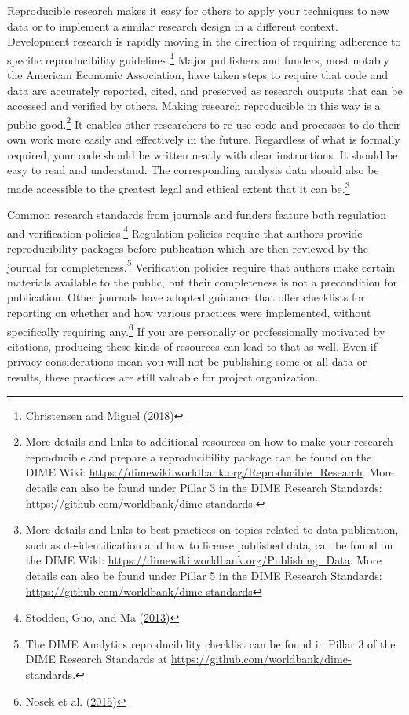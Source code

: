 \documentclass[
]{book}
\begin{document}
Reproducible research makes it easy
for others to apply your techniques to new data
or to implement a similar research design in a different context.
Development research is rapidly moving in the direction of requiring adherence
to specific reproducibility guidelines.\footnote{Christensen and Miguel (\protect\hyperlink{ref-christensen2018transparency}{2018})}
Major publishers and funders, most notably the American Economic Association,
have taken steps to require that code and data
are accurately reported, cited, and preserved as research outputs
that can be accessed and verified by others.
Making research reproducible in this way is a public good.\footnote{More details and links to additional resources on
  how to make your research reproducible and prepare a reproducibility package
  can be found on the DIME Wiki:
  \url{https://dimewiki.worldbank.org/Reproducible_Research}.
  More details can also be found under Pillar 3 in the DIME Research Standards:
  \url{https://github.com/worldbank/dime-standards}.}
It enables other researchers to re-use code and processes
to do their own work more easily and effectively in the future.
Regardless of what is formally required,
your code should be written neatly with clear instructions.
It should be easy to read and understand.
The corresponding analysis data should also be made accessible
to the greatest legal and ethical extent that it can be.\footnote{More details and links to best practices on topics related to data publication,
  such as de-identification and how to license published data,
  can be found on the DIME Wiki:
  \url{https://dimewiki.worldbank.org/Publishing_Data}.
  More details can also be found under Pillar 5 in the DIME Research Standards:
  \url{https://github.com/worldbank/dime-standards}}

Common research standards from journals and funders feature both
regulation and verification policies.\footnote{Stodden, Guo, and Ma (\protect\hyperlink{ref-stodden2013toward}{2013})}
Regulation policies require that authors
provide reproducibility packages before publication
which are then reviewed by the journal for completeness.\footnote{The DIME Analytics reproducibility checklist can be found in Pillar 3 of
  the DIME Research Standards at \url{https://github.com/worldbank/dime-standards}.}
Verification policies require that authors
make certain materials available to the public,
but their completeness is not a precondition for publication.
Other journals have adopted guidance that offer checklists
for reporting on whether and how various practices were implemented,
without specifically requiring any.\footnote{Nosek et al. (\protect\hyperlink{ref-nosek2015promoting}{2015})}
If you are personally or professionally motivated by citations,
producing these kinds of resources can lead to that as well.
Even if privacy considerations mean
you will not be publishing some or all data or results,
these practices are still valuable for project organization.
\end{document}
